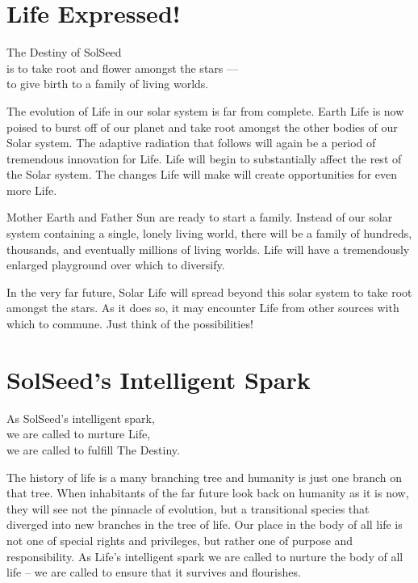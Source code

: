 \documentclass[ebook,12pt,openany,twoside]{memoir}
\newcommand{\tab}{\hspace*{2em}}
\newcommand{\imagefacingchapter}[1]{
  \cleartoverso
  \clearpage \null
  \thispagestyle{cleared}
  \AddToShipoutPictureBG*{%
    \AtStockLowerLeft{%
      \texttt{[image: \#1]}
    }
  }
  \clearpage
}
\begin{document}
\imagefacingchapter{images/MotherEarthFatherSun}
\chapter{Life Expressed!}

\setlength\epigraphwidth{3.2in}
\epigraph{
  The Destiny of SolSeed\\
  is to take root and flower amongst the stars ---\\
  \tab to give birth to a family of living worlds.
}{}

\noindent The evolution of Life in our solar system is far from complete. Earth
Life is now poised to burst off of our planet and take root amongst the other
bodies of our Solar system. The adaptive radiation that follows will again be a
period of tremendous innovation for Life. Life will begin to substantially
affect the rest of the Solar system. The changes Life will make will create
opportunities for even more Life.

Mother Earth and Father Sun are ready to start a family. Instead of our solar
system containing a single, lonely living world, there will be a family of
hundreds, thousands, and eventually millions of living worlds. Life will have a
tremendously enlarged playground over which to diversify.

In the very far future, Solar Life will spread beyond this solar system to take
root amongst the stars. As it does so, it may encounter Life from other sources
with which to commune.  Just think of the possibilities!

\imagefacingchapter{images/TakeRootAmongstTheStars-comp}
\chapter{SolSeed's Intelligent Spark}

\setlength\epigraphwidth{2.7in}
\epigraph{
  As SolSeed's intelligent spark,\\
  \tab we are called to nurture Life,\\
  \tab we are called to fulfill The Destiny.
}{}

\noindent The history of life is a many branching tree and humanity is just one
branch on that tree. When inhabitants of the far future look back on humanity
as it is now, they will see not the pinnacle of evolution, but a transitional
species that diverged into new branches in the tree of life. Our place in the
body of all life is not one of special rights and privileges, but rather one of
purpose and responsibility. As Life's intelligent spark we are called to
nurture the body of all life -- we are called to ensure that it survives and
flourishes.
\end{document}
